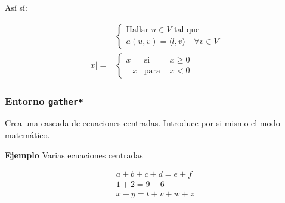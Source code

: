 \documentclass[11pt,a4paper]{report}
\begin{document}
\centerline{Así sí:}
\begin{equation*}
\begin{array}{ll}
&
\left\{ \begin{array}{l}
\text{Hallar }u\in V\text{ tal que } \\
a(u,v)=\langle l,v \rangle \quad \forall v \in V
\end{array} \right. 
\\[3ex]
|x|= &

\left\{
\begin{array}{rll}
x & \text{si } &x\geq0 \\
-x & \text{para }&x<0 
\end{array}
\right.

\end{array}
\end{equation*}

\bigskip





\subsubsection{Entorno \texttt{gather*}}





Crea una cascada de ecuaciones centradas. Introduce por si mismo el modo matemático.





\bigskip
\textbf{Ejemplo} Varias ecuaciones centradas

\begin{gather*}
a+b+c+d=e+f\\
1+2=9-6\\
x-y=t+v+w+z
\end{gather*}

\bigskip





\end{document}
